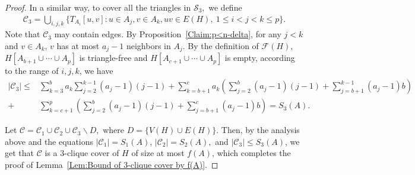 \documentclass[10pt,a4paper]{amsart}
\newcommand{\dC}{{\mathcal{C}}}
\newcommand{\dF}{{\mathcal{F}}}
\newcommand{\dS}{{\mathcal{S}}}
\begin{document}
\begin{proof}
In a similar way, to cover all the triangles in $\dS_3,$ we define
\begin{align*}
\dC_3=\bigcup\limits_{i,j,k} \{T_{A_i}[u,v]: u\in A_j, v\in A_k, uv\in E(H),\ 1\le i< j<k\le p\}.
\end{align*}
Note that $\dC_3$ may contain edges.
By Proposition~\ref{Claim:p<n-delta}, 
for any $j<k$ and $v\in A_k$, $v$ has at most $a_j-1$ neighbors in $A_j.$   
By the definition of $\dF(H),$ $H[A_{b+1}\cup\cdots\cup A_p]$ is triangle-free and $H[A_{c+1}\cup\cdots\cup A_p]$ is empty, according to the range of $i,j,k$, 
we have
\begin{align}\label{Equ:upper bound on C3}
|\dC_3|\leq &\sum_{k=3}^{b} a_k \sum_{j=2}^{k-1} (a_j-1) (j-1)
+\sum_{k=b+1}^{c} a_k
\left( \sum_{j=2}^{b}(a_j-1)(j-1) + \sum_{j=b+1}^{k-1}(a_j-1)b \right)\nonumber \\
+&\sum_{k=c+1}^{p} \left(  \sum_{j=2}^{b}(a_j-1)(j-1) + \sum_{j=b+1}^{c}(a_j-1)b \right)=S_3(A).
\end{align}

Let $\dC=\dC_1\cup \dC_2 \cup \dC_3\backslash D,$ where $D=\{V(H)\cup E(H)\}.$
Then, by the analysis above and the equations 
$|\dC_1|=S_1(A)$, $|\dC_2|=S_2(A),$ and $|\dC_3|\le S_3(A)$, 
we get that $\dC$ is a $3$-clique cover of $H$ of size at most $f(A)$, which completes the proof of Lemma~\ref{Lem:Bound of 3-clique cover by f(A)}. 
\end{proof}
\end{document}
